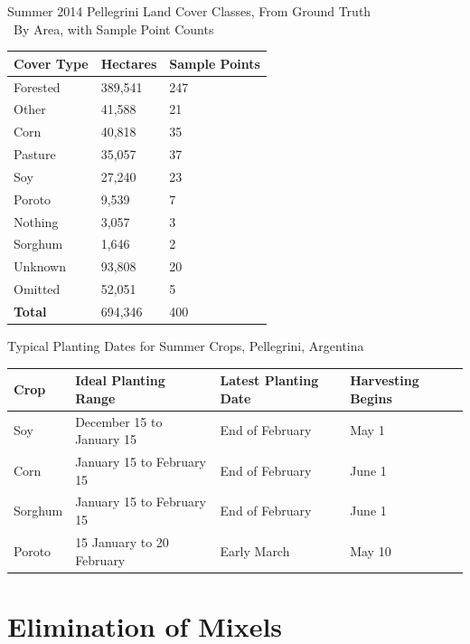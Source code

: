 \begin{sstable}
  \centering
  \caption[Summer 2014 Pellegrini Land Cover Classes, From Ground Truth]{Summer 2014 Pellegrini Land Cover Classes, From Ground Truth\\~By Area, with Sample Point Counts}
  \label{table:pellegrini:LCarea}
  \begin{tabu}{XX[r]X[r]}
    \toprule
    \textbf{Cover Type} & \textbf{Hectares} & \textbf{Sample Points} \\
    \midrule
    Forested & 389,541 & 247 \\
    Other & 41,588 & 21 \\
    Corn & 40,818 & 35 \\
    Pasture & 35,057 & 37 \\
    Soy & 27,240 & 23 \\
    Poroto & 9,539 & 7 \\
    Nothing & 3,057 & 3 \\
    Sorghum & 1,646 & 2 \\
    \midrule
    Unknown & 93,808 & 20 \\
    Omitted & 52,051 & 5 \\
    \midrule
    \textbf{Total} & 694,346 & 400 \\
    \bottomrule
  \end{tabu}
\end{sstable}

\begin{sstable}
  \centering
  \caption{Typical Planting Dates for Summer Crops, Pellegrini, Argentina}
  \label{table:plantingdates}
  \begin{tabu}{X[0.45,m,c]X[1,m,c]X[.95,m,c]X[0.5,m,c]}
    \toprule
    \textbf{Crop} & \textbf{Ideal Planting Range} & \textbf{Latest Planting Date} & \textbf{Harvesting Begins} \\
    \midrule
    Soy & December 15 to January 15 & End of February & May 1 \\
    Corn & January 15 to February 15 & End of February & June 1 \\
    Sorghum & January 15 to February 15 & End of February & June 1 \\
    Poroto & 15 January to 20 February & Early March & May 10 \\
    \bottomrule
  \end{tabu}
\end{sstable}


\section{Elimination of Mixels}

